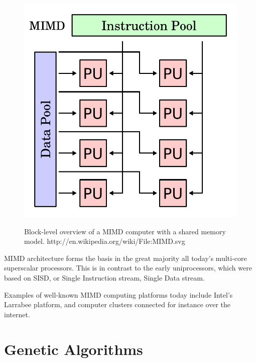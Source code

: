 \begin{figure}[H]
\begin{center}
    \includegraphics[width=\textwidth/2]{fig/mimd-block-diagram.pdf}
    \label{figure:mimd-block-diagram}
    \caption[
    Block-level overview of a MIMD computer with a shared memory model
    ]{
    Block-level overview of a MIMD computer with a shared memory model.
   http://en.wikipedia.org/wiki/File:MIMD.svg 
   }
\end{center}
\end{figure}


MIMD architecture forms the basis in the great majority all today’s multi-core superscalar processors.
This is in contrast to the early uniprocessors, which were based on SISD, or Single Instruction stream, Single Data stream. 


Examples of well-known MIMD computing platforms today include Intel's Larrabee platform, and computer clusters connected for instance over the internet.

\section{Genetic Algorithms}
\label{ga-algorithms}

